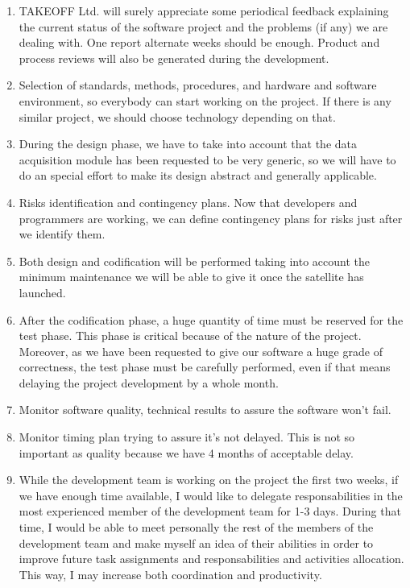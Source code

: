 \documentclass{article}
\begin{document}
\begin{enumerate}
\item TAKEOFF Ltd. will surely appreciate some periodical feedback explaining the current status of the software project and the problems (if any) we are dealing with. One report alternate weeks should be enough. Product and process reviews will also be generated during the development.

\item Selection of standards, methods, procedures, and hardware and software environment, so everybody can start working on the project. If there is any similar project, we should choose technology depending on that.

\item During the design phase, we have to take into account that the data acquisition module has been requested to be very generic, so we will have to do an special effort to make its design abstract and generally applicable.

\item Risks identification and contingency plans. Now that developers and programmers are working, we can define contingency plans for risks just after we identify them.

\item Both design and codification will be performed taking into account the minimum maintenance we will be able to give it once the satellite has launched. 

\item After the codification phase, a huge quantity of time must be reserved for the test phase. This phase is critical because of the nature of the project. Moreover, as we have been requested to give our software a huge grade of correctness, the test phase must be carefully performed, even if that means delaying the project development by a whole month.

\item Monitor software quality, technical results to assure the software won't fail.

\item Monitor timing plan trying to assure it's not delayed. This is not so important as quality because we have 4 months of acceptable delay.

\item While the development team is working on the project the first two weeks, if we have enough time available, I would like to delegate responsabilities in the most experienced member of the development team for 1-3 days. During that time, I would be able to meet personally the rest of the members of the development team and make myself an idea of their abilities in order to improve future task assignments and responsabilities and activities allocation. This way, I may increase both coordination and productivity.


\end{enumerate}
\end{document}
